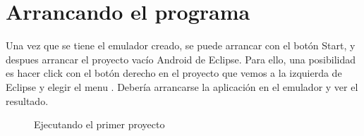 \documentclass[a4paper,12pt,spanish]{sphinxmanual}
\begin{document}
\section{Arrancando el programa}
\label{tema1:arrancando-el-programa}
Una vez que se tiene el emulador creado, se puede arrancar con el botón Start, y despues arrancar el proyecto vacío Android de Eclipse. Para ello, una posibilidad es hacer click con el botón derecho en el proyecto que vemos a la izquierda de Eclipse y elegir el menu . Debería arrancarse la aplicación en el emulador y ver el resultado.
\begin{figure}[htbp]
\centering
\capstart

\caption{Ejecutando el primer proyecto}\end{figure}
\end{document}
